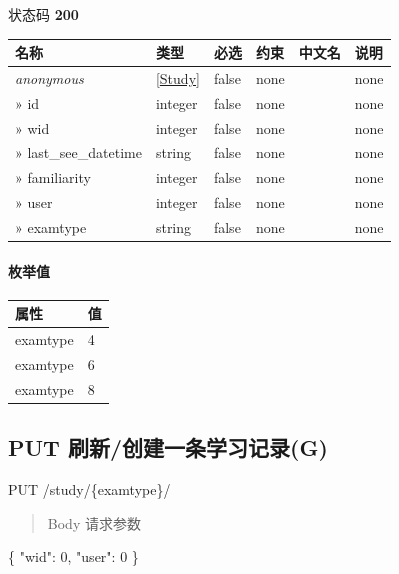 \documentclass[
]{article}
\newenvironment{Shaded}{}{}
\newcommand{\DataTypeTok}[1]{\textcolor[rgb]{0.56,0.13,0.00}{#1}}
\newcommand{\DecValTok}[1]{\textcolor[rgb]{0.25,0.63,0.44}{#1}}
\newcommand{\FunctionTok}[1]{\textcolor[rgb]{0.02,0.16,0.49}{#1}}
\begin{document}
状态码 \textbf{200}

\begin{longtable}[]{@{}llllll@{}}
\toprule
名称 & 类型 & 必选 & 约束 & 中文名 & 说明 \\
\midrule
\endhead
\emph{anonymous} & {[}\protect\hyperlink{schemastudy}{Study}{]} & false
& none & & none \\
» id & integer & false & none & & none \\
» wid & integer & false & none & & none \\
» last\_see\_datetime & string & false & none & & none \\
» familiarity & integer & false & none & & none \\
» user & integer & false & none & & none \\
» examtype & string & false & none & & none \\
\bottomrule
\end{longtable}

\hypertarget{ux679aux4e3eux503c-4}{%
\paragraph{枚举值}\label{ux679aux4e3eux503c-4}}

\begin{longtable}[]{@{}ll@{}}
\toprule
属性 & 值 \\
\midrule
\endhead
examtype & 4 \\
examtype & 6 \\
examtype & 8 \\
\bottomrule
\end{longtable}

\hypertarget{put-ux5237ux65b0ux521bux5efaux4e00ux6761ux5b66ux4e60ux8bb0ux5f55g}{%
\subsection{\texorpdfstring{PUT 刷新/创建一条学习记录(G)
}{PUT 刷新/创建一条学习记录(G) }}\label{put-ux5237ux65b0ux521bux5efaux4e00ux6761ux5b66ux4e60ux8bb0ux5f55g}}

PUT /study/\{examtype\}/

\begin{quote}
Body 请求参数
\end{quote}

\begin{Shaded}
\begin{Highlighting}[]
\FunctionTok{\{}
  \DataTypeTok{"wid"}\FunctionTok{:} \DecValTok{0}\FunctionTok{,}
  \DataTypeTok{"user"}\FunctionTok{:} \DecValTok{0}
\FunctionTok{\}}
\end{Highlighting}
\end{Shaded}
\end{document}
